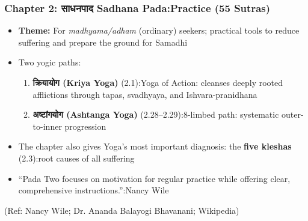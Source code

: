 \begin{frame}[fragile]\frametitle{Chapter 2: साधनपाद Sadhana Pada:Practice (55 Sutras)}

\begin{itemize}
\item \textbf{Theme:} For \emph{madhyama/adham} (ordinary) seekers; practical tools to reduce suffering and prepare the ground for Samadhi
\item Two yogic paths:
    \begin{enumerate}
    \item \textbf{क्रियायोग (Kriya Yoga)} (2.1):Yoga of Action: cleanses deeply rooted afflictions through tapas, svadhyaya, and Ishvara-pranidhana
    \item \textbf{अष्टांगयोग (Ashtanga Yoga)} (2.28–2.29):8-limbed path: systematic outer-to-inner progression
    \end{enumerate}
\item The chapter also gives Yoga's most important diagnosis: the \textbf{five kleshas} (2.3):root causes of all suffering
\item ``Pada Two focuses on motivation for regular practice while offering clear, comprehensive instructions.'':Nancy Wile
\end{itemize}

\tiny{(Ref: Nancy Wile; Dr. Ananda Balayogi Bhavanani; Wikipedia)}

\end{frame}

